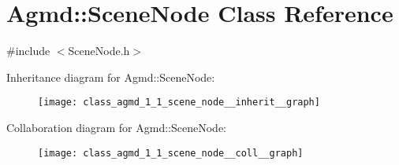 \hypertarget{class_agmd_1_1_scene_node}{\section{Agmd\+:\+:Scene\+Node Class Reference}
\label{class_agmd_1_1_scene_node}
}


{\ttfamily \#include $<$Scene\+Node.\+h$>$}



Inheritance diagram for Agmd\+:\+:Scene\+Node\+:\nopagebreak
\begin{figure}[H]
\begin{center}
\leavevmode
\texttt{[image: class\_agmd\_1\_1\_scene\_node\_\_inherit\_\_graph]}
\end{center}
\end{figure}


Collaboration diagram for Agmd\+:\+:Scene\+Node\+:\nopagebreak
\begin{figure}[H]
\begin{center}
\leavevmode
\texttt{[image: class\_agmd\_1\_1\_scene\_node\_\_coll\_\_graph]}
\end{center}
\end{figure}
